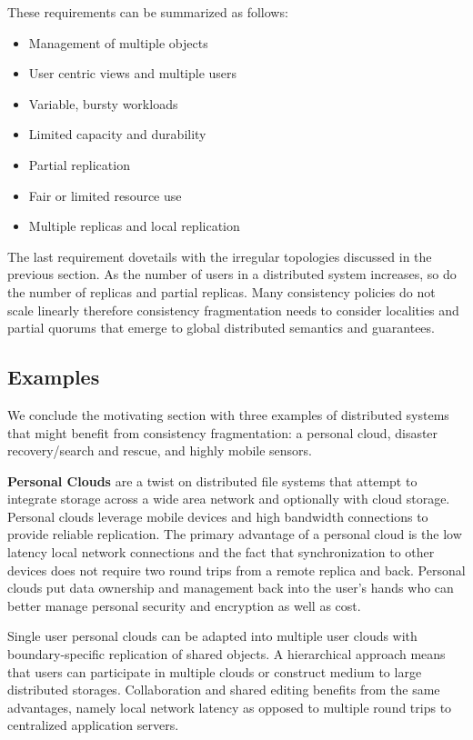 \documentclass[letterpaper,twocolumn,10pt]{article}
\begin{document}
These requirements can be summarized as follows:

\begin{itemize}
    \item Management of multiple objects
    \item User centric views and multiple users
    \item Variable, bursty workloads
    \item Limited capacity and durability
    \item Partial replication
    \item Fair or limited resource use
    \item Multiple replicas and local replication
\end{itemize}

The last requirement dovetails with the irregular topologies discussed in the previous section. As the number of users in a distributed system increases, so do the number of replicas and partial replicas. Many consistency policies do not scale linearly therefore consistency fragmentation needs to consider localities and partial quorums that emerge to global distributed semantics and guarantees.

\subsection{Examples}

We conclude the motivating section with three examples of distributed systems that might benefit from consistency fragmentation: a personal cloud, disaster recovery/search and rescue, and highly mobile sensors.

\textbf{Personal Clouds} are a twist on distributed file systems that attempt to integrate storage across a wide area network and optionally with cloud storage. Personal clouds leverage mobile devices and high bandwidth connections to provide reliable replication. The primary advantage of a personal cloud is the low latency local network connections and the fact that synchronization to other devices does not require two round trips from a remote replica and back. Personal clouds put data ownership and management back into the user's hands who can better manage personal security and encryption as well as cost.

Single user personal clouds can be adapted into multiple user clouds with boundary-specific replication of shared objects. A hierarchical approach means that users can participate in multiple clouds or construct medium to large distributed storages. Collaboration and shared editing benefits from the same advantages, namely local network latency as opposed to multiple round trips to centralized application servers.
\end{document}
